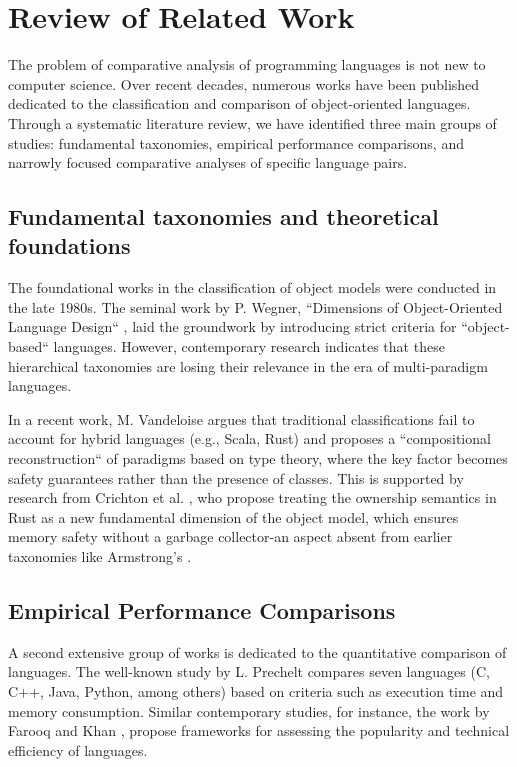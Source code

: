 \section{Review of Related Work}

The problem of comparative analysis of programming languages is not new to computer science. Over recent decades, numerous works have been published dedicated to the classification and comparison of object-oriented languages. Through a systematic literature review, we have identified three main groups of studies: fundamental taxonomies, empirical performance comparisons, and narrowly focused comparative analyses of specific language pairs.

\subsection{Fundamental taxonomies and theoretical foundations}

The foundational works in the classification of object models were conducted in the late 1980s. The seminal work by P. Wegner, ``Dimensions of Object-Oriented Language Design`` \cite{wegner1987dimensions}, laid the groundwork by introducing strict criteria for ``object-based`` languages. However, contemporary research indicates that these hierarchical taxonomies are losing their relevance in the era of multi-paradigm languages.

In a recent work, M. Vandeloise \cite{vandeloise2025towards} argues that traditional classifications fail to account for hybrid languages (e.g., Scala, Rust) and proposes a ``compositional reconstruction`` of paradigms based on type theory, where the key factor becomes safety guarantees rather than the presence of classes. This is supported by research from Crichton et al. \cite{crichton2023grounded}, who propose treating the ownership semantics in Rust as a new fundamental dimension of the object model, which ensures memory safety without a garbage collector-an aspect absent from earlier taxonomies like Armstrong's \cite{armstrong2006quarks}.

\subsection{Empirical Performance Comparisons}

A second extensive group of works is dedicated to the quantitative comparison of languages. The well-known study by L. Prechelt \cite{prechelt2002empirical} compares seven languages (C, C++, Java, Python, among others) based on criteria such as execution time and memory consumption. Similar contemporary studies, for instance, the work by Farooq and Khan \cite{farooq2023comparative}, propose frameworks for assessing the popularity and technical efficiency of languages.

